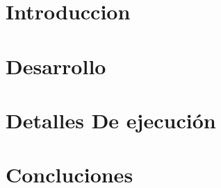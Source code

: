 \documentclass[10pt, a4paper]{article}
\begin{document}

\tableofcontents
\section{Introduccion}

\section{Desarrollo}

\section{Detalles De ejecución}

\section{Concluciones}

\end{document}
